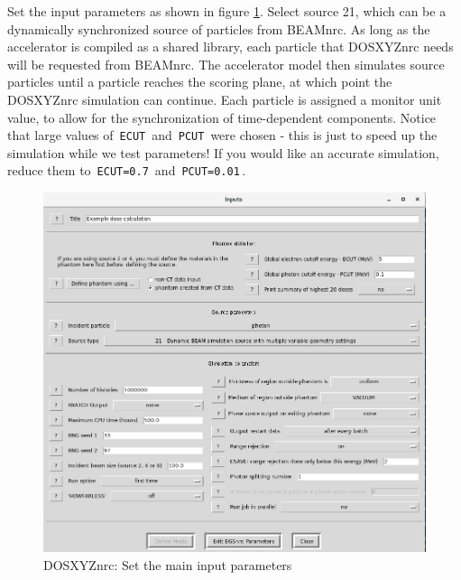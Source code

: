 \documentclass[12pt,twoside]{article}
\begin{document}
Set the input parameters as shown in figure \ref{fig:dosxyz_step2}. Select source 21, which can be a dynamically synchronized source of particles from BEAMnrc. As long as the accelerator is compiled as a shared library, each particle that DOSXYZnrc needs will be requested from BEAMnrc. The accelerator model then simulates source particles until a particle reaches the scoring plane, at which point the DOSXYZnrc simulation can continue. Each particle is assigned a monitor unit value, to allow for the synchronization of time-dependent components. Notice that large values of \,\Verb|ECUT|\, and \,\Verb|PCUT|\, were chosen - this is just to speed up the simulation while we test parameters! If you would like an accurate simulation, reduce them to \,\Verb|ECUT=0.7|\, and \,\Verb|PCUT=0.01|\,.

\begin{figure}
\begin{center}
\includegraphics[width=5in]{figures/dosxyz_step2}
\caption{DOSXYZnrc: Set the main input parameters}
\label{fig:dosxyz_step2}
\end{center}
\end{figure}
\end{document}
